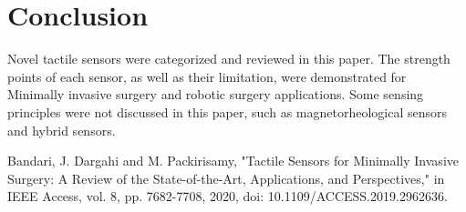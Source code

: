 \documentclass[conference]{IEEEtran}
\begin{document}
\section{Conclusion}
Novel tactile sensors were categorized and reviewed in this paper. The strength points of each sensor, as well as their limitation, were demonstrated for Minimally invasive surgery and robotic surgery applications. Some sensing principles were not discussed in this paper, such as magnetorheological sensors and hybrid sensors. 
% 
%
\begin{thebibliography}{00}
 Bandari, J. Dargahi and M. Packirisamy, "Tactile Sensors for Minimally Invasive Surgery: A Review of the State-of-the-Art, Applications, and Perspectives," in IEEE Access, vol. 8, pp. 7682-7708, 2020, doi: 10.1109/ACCESS.2019.2962636.
\end{thebibliography}
\end{document}
